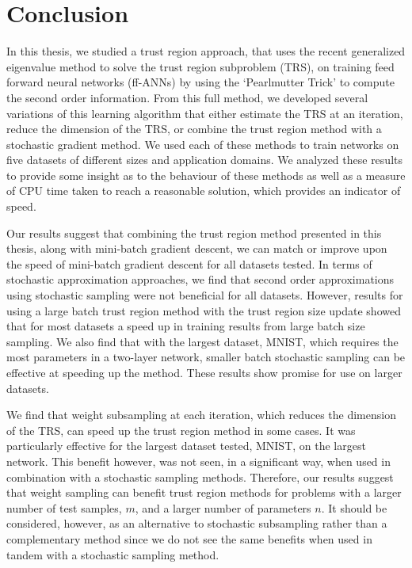 \documentclass[letterpaper,12pt,titlepage,oneside,final]{book}
\begin{document}
	\chapter{Conclusion}
	
	In this thesis, we studied a trust region approach, that uses the recent generalized eigenvalue method to solve the trust region subproblem (TRS), on training feed forward neural networks (ff-ANNs) by using the `Pearlmutter Trick' to compute the second order information. From this full method, we developed several variations of this learning algorithm that either estimate the TRS at an iteration, reduce the dimension of the TRS, or combine the trust region method with a stochastic gradient method. We used each of these methods to train networks on five datasets of different sizes and application domains. We analyzed these results to provide some insight as to the behaviour of these methods as well as a measure of CPU time taken to reach a reasonable solution, which provides an indicator of speed.
	
	Our results suggest that combining the trust region method presented in this thesis, along with mini-batch gradient descent, we can match or improve upon the speed of mini-batch gradient descent for all datasets tested. In terms of stochastic approximation approaches, we find that second order approximations using stochastic sampling were not beneficial for all datasets. However, results for using a large batch trust region method with the trust region size update showed that for most datasets a speed up in training results from large batch size sampling. We also find that with the largest dataset, MNIST, which requires the most parameters in a two-layer network, smaller batch stochastic sampling can be effective at speeding up the method. These results show promise for use on larger datasets.
	
	We find that weight subsampling at each iteration, which reduces the dimension of the TRS, can speed up the trust region method in some cases. It was particularly effective for the largest dataset tested, MNIST, on the largest network. This benefit however, was not seen, in a significant way, when used in combination with a stochastic sampling methods. Therefore, our results suggest that weight sampling can benefit trust region methods for problems with a larger number of test samples, $m$, and a larger number of parameters $n$. It should be considered, however, as an alternative to stochastic subsampling rather than a complementary method since we do not see the same benefits when used in tandem with a stochastic sampling method.
	
\end{document}
